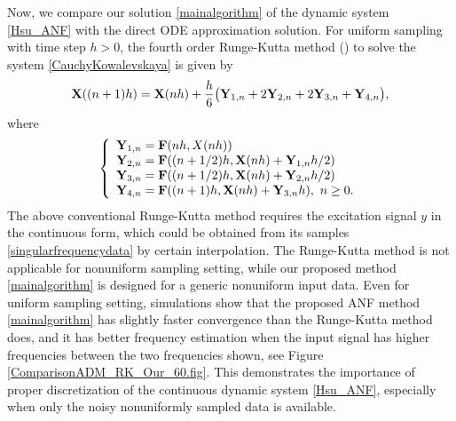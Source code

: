 \documentclass{UCF_ETD}
\begin{document}
Now, we compare our solution \eqref{mainalgorithm} of the dynamic system \eqref{Hsu_ANF} with the direct %
 ODE approximation solution.
 For uniform sampling with  time step $h>0$,  the fourth order
Runge-Kutta  method (\cite{burden10}) to solve the %
  system
 \eqref{CauchyKowalevskaya}
  is given by
\begin{equation*} \label{Runge-Kutta}
 {\bf X}((n+1)h) = {\bf X}(nh) + \frac{h}{6}\big({\bf Y}_{1, n}+2 {\bf Y}_{2, n}+ 2{\bf Y}_{3,n}+{\bf Y}_{4, n}\big), %
\end{equation*}
where  %
$$\left\{\begin{array}{l} {\bf Y}_{1, n} = {\bf F}(nh, X(nh))\\
{\bf Y}_{2, n} = {\bf F}((n+1/2)h, {\bf X}(nh)+ {\bf Y}_{1, n} h/2)\\
{\bf Y}_{3,n} ={\bf  F}((n+1/2)h ,{\bf X}(nh)+ {\bf Y}_{2, n} h/2)\\
{\bf Y}_{4, n}= {\bf F}((n+1)h, {\bf X}(nh)+ {\bf Y}_{3, n} h),\  n\ge 0.
\end{array}\right.$$
 The above conventional Runge-Kutta method  requires the excitation signal $y$ in the continuous form,
 which could be obtained from its samples \eqref{singularfrequencydata}  by certain  interpolation.
The Runge-Kutta method is not applicable for nonuniform sampling setting, while our  proposed method
\eqref{mainalgorithm} is designed for a generic nonuniform input data.
 Even for uniform sampling setting, simulations show that the proposed ANF method \eqref{mainalgorithm}
 has slightly faster convergence than the  Runge-Kutta method %
 does, and
it has better  frequency estimation when the input signal has higher frequencies between the two frequencies shown, see
Figure \ref{ComparisonADM_RK_Our_60.fig}.
This demonstrates the importance of proper discretization of the continuous dynamic system \eqref{Hsu_ANF}, especially
when only the noisy nonuniformly sampled data is available.
\end{document}
